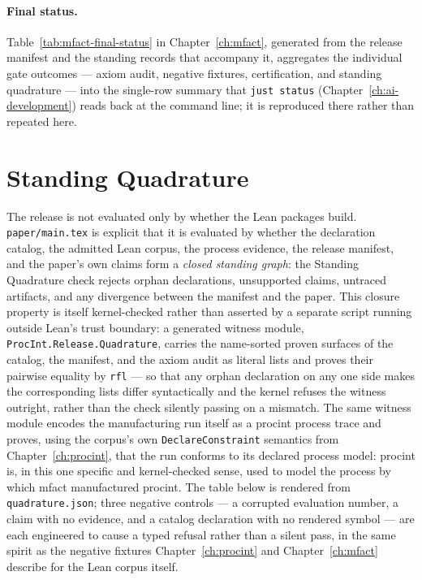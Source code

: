 

\paragraph{Final status.} Table~\ref{tab:mfact-final-status} in
Chapter~\ref{ch:mfact}, generated from the release manifest and the
standing records that accompany it, aggregates the individual gate
outcomes --- axiom audit, negative fixtures, certification, and standing
quadrature --- into the single-row summary that \texttt{just status}
(Chapter~\ref{ch:ai-development}) reads back at the command line; it is
reproduced there rather than repeated here.

\section{Standing Quadrature}
\label{sec:eval-quadrature}

The release is not evaluated only by whether the Lean packages build.
\texttt{paper/main.tex} is explicit that it is evaluated by whether the
declaration catalog, the admitted Lean corpus, the process evidence, the
release manifest, and the paper's own claims form a \emph{closed standing
graph}: the Standing Quadrature check rejects orphan declarations,
unsupported claims, untraced artifacts, and any divergence between the
manifest and the paper. This closure property is itself kernel-checked
rather than asserted by a separate script running outside Lean's trust
boundary: a generated witness module, \texttt{ProcInt.Release.Quadrature},
carries the name-sorted proven surfaces of the catalog, the manifest, and
the axiom audit as literal lists and proves their pairwise equality by
\texttt{rfl} --- so that any orphan declaration on any one side makes the
corresponding lists differ syntactically and the kernel refuses the
witness outright, rather than the check silently passing on a mismatch.
The same witness module encodes the manufacturing run itself as a
\textsf{procint} process trace and proves, using the corpus's own
\texttt{DeclareConstraint} semantics from Chapter~\ref{ch:procint}, that
the run conforms to its declared process model: \textsf{procint} is, in
this one specific and kernel-checked sense, used to model the process by
which \textsf{mfact} manufactured \textsf{procint}. The table below is
rendered from \texttt{quadrature.json}; three negative controls --- a
corrupted evaluation number, a claim with no evidence, and a catalog
declaration with no rendered symbol --- are each engineered to cause a
typed refusal rather than a silent pass, in the same spirit as the
negative fixtures Chapter~\ref{ch:procint} and Chapter~\ref{ch:mfact}
describe for the Lean corpus itself.

